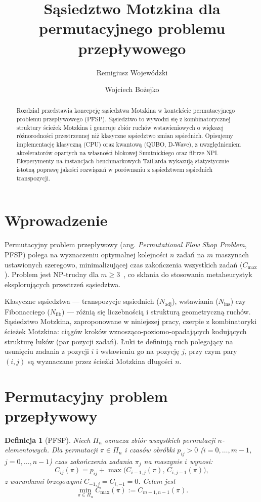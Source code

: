 \documentclass[12pt,a4paper]{article}
\title{Sąsiedztwo Motzkina dla permutacyjnego problemu przepływowego}
\author{Remigiusz Wojewódzki \and Wojciech Bożejko}
\date{}
\newtheorem{definicja}{Definicja}
\begin{document}

\maketitle

\begin{abstract}
Rozdział przedstawia koncepcję sąsiedztwa Motzkina w kontekście permutacyjnego problemu przepływowego (PFSP). Sąsiedztwo to wywodzi się z kombinatorycznej struktury ścieżek Motzkina i generuje zbiór ruchów wstawieniowych o większej różnorodności przestrzennej niż klasyczne sąsiedztwo zmian sąsiednich. Opisujemy implementację klasyczną (CPU) oraz kwantową (QUBO, D-Wave), z uwzględnieniem akceleratorów opartych na własności blokowej Smutnickiego oraz filtrze NPI. Eksperymenty na instancjach benchmarkowych Taillarda wykazują statystycznie istotną poprawę jakości rozwiązań w porównaniu z sąsiedztwem sąsiednich transpozycji.
\end{abstract}

\section{Wprowadzenie}

Permutacyjny problem przepływowy (ang. \emph{Permutational Flow Shop Problem}, PFSP) polega na wyznaczeniu optymalnej kolejności $n$ zadań na $m$ maszynach ustawionych szeregowo, minimalizującej czas zakończenia wszystkich zadań ($C_{\max}$). Problem jest NP-trudny dla $m \geq 3$~\cite{garey79}, co skłania do stosowania metaheurystyk eksplorujących przestrzeń sąsiedztwa.

Klasyczne sąsiedztwa — transpozycje sąsiednich ($N_{\mathrm{adj}}$), wstawiania ($N_{\mathrm{ins}}$) czy Fibonacciego ($N_{\mathrm{fib}}$) — różnią się liczebnością i strukturą geometryczną ruchów. Sąsiedztwo Motzkina, zaproponowane w niniejszej pracy, czerpie z kombinatoryki ścieżek Motzkina: ciągów kroków wznosząco-poziomo-opadających kodujących strukturę łuków (par pozycji zadań). Łuki te definiują ruch polegający na usunięciu zadania z pozycji $i$ i wstawieniu go na pozycję $j$, przy czym pary $(i,j)$ są wyznaczane przez ścieżki Motzkina długości $n$.

\section{Permutacyjny problem przepływowy}

\begin{definicja}[PFSP]
Niech $\Pi_n$ oznacza zbiór wszystkich permutacji $n$-elementowych. Dla permutacji $\pi \in \Pi_n$ i czasów obróbki $p_{ij} > 0$ ($i = 0,\ldots,m-1$, $j = 0,\ldots,n-1$) czas zakończenia zadania $\pi_j$ na maszynie $i$ wynosi:
\[
C_{ij}(\pi) = p_{ij} + \max\bigl(C_{i-1,j}(\pi),\, C_{i,j-1}(\pi)\bigr),
\]
z warunkami brzegowymi $C_{-1,j} = C_{i,-1} = 0$. Celem jest
\[
\min_{\pi \in \Pi_n} C_{\max}(\pi) := C_{m-1,n-1}(\pi).
\]
\end{definicja}
\end{document}
